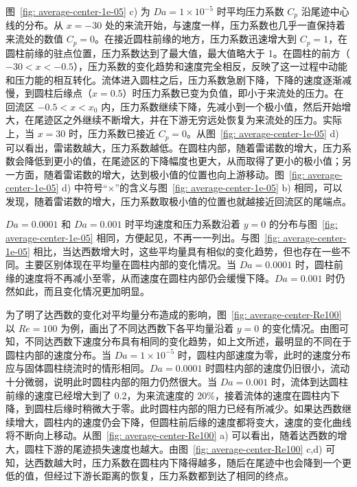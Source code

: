 图~\ref{fig: average-center-1e-05} c) 为 $Da=1\times 10^{-5}$ 时平均压力系数 $C_p$ 沿尾迹中心线的分布。从 $x=-30$ 处的来流开始，与速度一样，压力系数也几乎一直保持着来流处的数值 $C_p=0$。在接近圆柱前缘的地方，压力系数迅速增大到 $C_p=1$，在圆柱前缘的驻点位置，压力系数达到了最大值，最大值略大于 1。在圆柱的前方（$-30<x<-0.5$），压力系数的变化趋势和速度完全相反，反映了这一过程中动能和压力能的相互转化。流体进入圆柱之后，压力系数急剧下降，下降的速度逐渐减慢，到圆柱后缘点（$x=0.5$）时压力系数已变为负值，即小于来流处的压力。在回流区 $-0.5<x<x_0$ 内，压力系数继续下降，先减小到一个极小值，然后开始增大，在尾迹区之外继续不断增大，并在下游无穷远处恢复为来流处的压力。实际上，当 $x=30$ 时，压力系数已接近 $C_p=0$。从图~\ref{fig: average-center-1e-05} d) 可以看出，雷诺数越大，压力系数越低。在圆柱内部，随着雷诺数的增大，压力系数会降低到更小的值，在尾迹区的下降幅度也更大，从而取得了更小的极小值；另一方面，随着雷诺数的增大，达到极小值的位置也向上游移动。图~\ref{fig: average-center-1e-05} d) 中符号“$\times$”的含义与图~\ref{fig: average-center-1e-05} b) 相同，可以发现，随着雷诺数的增大，压力系数取极小值的位置也就越接近回流区的尾端点。

$Da=0.0001$ 和 $Da=0.001$ 时平均速度和压力系数沿着 $y=0$ 的分布与图~\ref{fig: average-center-1e-05} 相同，方便起见，不再一一列出。与图~\ref{fig: average-center-1e-05} 相比，当达西数增大时，这些平均量具有相似的变化趋势，但也存在一些不同。主要区别体现在平均量在圆柱内部的变化情况。当 $Da=0.0001$ 时，圆柱前缘的速度将不再减小至零，从而速度在圆柱内部仍会缓慢下降。$Da=0.001$ 时仍然如此，而且变化情况更加明显。

为了明了达西数的变化对平均量分布造成的影响，图~\ref{fig: average-center-Re100} 以 $Re=100$ 为例，画出了不同达西数下各平均量沿着 $y=0$ 的变化情况。由图可知，不同达西数下速度分布具有相同的变化趋势，如上文所述，最明显的不同在于圆柱内部的速度分布。当 $Da=1\times 10^{-5}$ 时，圆柱内部速度为零，此时的速度分布应与固体圆柱绕流时的情形相同。$Da=0.0001$ 时圆柱内部的速度仍旧很小，流动十分微弱，说明此时圆柱内部的阻力仍然很大。当 $Da=0.001$ 时，流体到达圆柱前缘的速度已经增大到了 0.2，为来流速度的 20\%，接着流体的速度在圆柱内下降，到圆柱后缘时稍微大于零。此时圆柱内部的阻力已经有所减少。如果达西数继续增大，圆柱内的速度仍会下降，但圆柱前后缘的速度都将变大，速度的变化曲线将不断向上移动。从图~\ref{fig: average-center-Re100} a) 可以看出，随着达西数的增大，圆柱下游的尾迹损失速度也越大。由图~\ref{fig: average-center-Re100} c,d) 可知，达西数越大时，压力系数在圆柱内下降得越多，随后在尾迹中也会降到一个更低的值，但经过下游长距离的恢复，压力系数都到达了相同的终点。%


